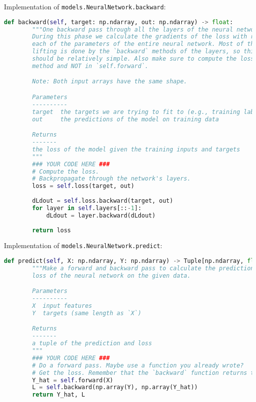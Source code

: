Implementation of \texttt{models.NeuralNetwork.backward}:

\begin{lstlisting}[language=Python]
    def backward(self, target: np.ndarray, out: np.ndarray) -> float:
        """One backward pass through all the layers of the neural network.
        During this phase we calculate the gradients of the loss with respect to
        each of the parameters of the entire neural network. Most of the heavy
        lifting is done by the `backward` methods of the layers, so this method
        should be relatively simple. Also make sure to compute the loss in this
        method and NOT in `self.forward`.

        Note: Both input arrays have the same shape.

        Parameters
        ----------
        target  the targets we are trying to fit to (e.g., training labels)
        out     the predictions of the model on training data

        Returns
        -------
        the loss of the model given the training inputs and targets
        """
        ### YOUR CODE HERE ###
        # Compute the loss.
        # Backpropagate through the network's layers.
        loss = self.loss(target, out)
        
        dLdout = self.loss.backward(target, out)
        for layer in self.layers[::-1]:
            dLdout = layer.backward(dLdout)
        
        return loss

\end{lstlisting}

Implementation of \texttt{models.NeuralNetwork.predict}:

\begin{lstlisting}[language=Python]
    def predict(self, X: np.ndarray, Y: np.ndarray) -> Tuple[np.ndarray, float]:
        """Make a forward and backward pass to calculate the predictions and
        loss of the neural network on the given data.

        Parameters
        ----------
        X  input features
        Y  targets (same length as `X`)

        Returns
        -------
        a tuple of the prediction and loss
        """
        ### YOUR CODE HERE ###
        # Do a forward pass. Maybe use a function you already wrote?
        # Get the loss. Remember that the `backward` function returns the loss.
        Y_hat = self.forward(X)
        L = self.backward(np.array(Y), np.array(Y_hat))
        return Y_hat, L

\end{lstlisting}

